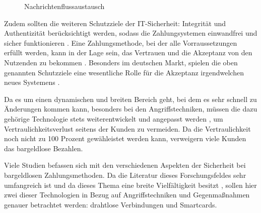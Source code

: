 \vfill
\begin{figure}[H]
    \caption{Nachrichtenflussaustausch \cite{refart:JTAS}}
    \label{fig:refart:JTAS_2}
\end{figure}

Zudem sollten die weiteren Schutzziele der IT-Sicherheit: Integrität und Authentizität berücksichtigt werden, 
sodass die Zahlungsystemen einwandfrei und sicher funktionieren \cite{refip:GMPS}. Eine Zahlungsmethode, bei der 
alle Vorraussetzungen erfüllt werden, kann in der Lage sein, das Vertrauen und die Akzeptanz von den Nutzenden 
zu bekommen \cite{refart:HARE}. Besonders im deutschen Markt, spielen die oben genannten Schutzziele eine 
wesentliche Rolle für die Akzeptanz irgendwelchen neues Systemens \cite{refip:DKAM}.

Da es um einen dynamischen und breiten Bereich geht, bei dem es sehr schnell zu Änderungen kommen kann, 
besonders bei den Angriffstechniken, müssen die dazu gehörige Technologie stets weiterentwickelt und 
angepasst werden \cite{refip:NYRS}, um Vertraulichkeitsverlust seitens der Kunden zu vermeiden. 
Da die Vertraulichkeit noch nicht zu 100 Prozent gewähleistet werden kann, verweigern viele Kunden
das bargeldlose Bezahlen.

Viele Studien befassen sich mit den verschiedenen Aspekten der Sicherheit bei bargeldlosen Zahlungsmethoden.
Da die Literatur dieses Forschungsfeldes sehr umfangreich ist und da dieses Thema eine breite Vielfältigkeit 
besitzt \cite{refip:GMPS}, sollen hier zwei dieser Technologien in Bezug auf Angriffstechniken und
Gegenmaßnahmen genauer betrachtet werden: drahtlose Verbindungen und Smartcards.

